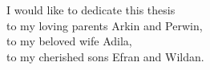 
\begin{dedication} 




\begin{LARGE}
{\fmmfamily I would like to dedicate this thesis \\
to my loving parents Arkin and Perwin, \\
to my beloved wife Adila,  \\
to my cherished sons Efran and Wildan.}
\end{LARGE}




\end{dedication}

